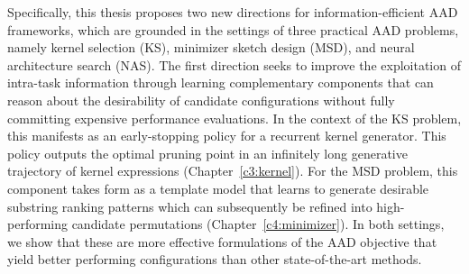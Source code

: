 Specifically, this thesis proposes two new directions for information-efficient AAD frameworks, which are grounded in the settings of three practical AAD problems, namely kernel selection (KS), minimizer sketch design (MSD), and neural architecture search (NAS). The first direction seeks to improve the exploitation of intra-task information through learning complementary components that can reason about the desirability of candidate configurations without fully committing expensive performance evaluations. In the context of the KS problem, this manifests as an early-stopping policy for a recurrent kernel generator. This policy outputs the optimal pruning point in an infinitely long generative trajectory of kernel expressions (Chapter~\ref{c3:kernel}). For the MSD problem, this component takes form as a template model that learns to generate desirable substring ranking patterns which can subsequently be refined into high-performing candidate permutations (Chapter~\ref{c4:minimizer}). In both settings, we show that these are more effective formulations of the AAD objective that yield better performing configurations than other state-of-the-art methods.

